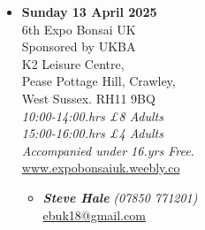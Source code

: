 \begin{itemize}
    \item \textbf{Sunday 13 April 2025}
    \\
    6th Expo Bonsai UK \\
    Sponsored by UKBA \\
    K2 Leisure Centre, \\
    Pease Pottage Hill, Crawley, \\
    West Sussex. RH11 9BQ
    \\
    \emph{10:00-14:00.hrs £8 Adults} \\
    \emph{15:00-16:00.hrs £4 Adults} \\
    \emph{Accompanied under 16.yrs Free.}
    \\
    \href{http://www.expobonsaiuk.weebly.co/}{www.expobonsaiuk.weebly.co}
    \begin{itemize}
        \item \textbf{\emph{Steve Hale}} \emph{(07850 771201)} \\
        \href{mailto:ebuk18@gmail.com}{ebuk18@gmail.com} 
    \end{itemize}

\end{itemize}
\closearticle
